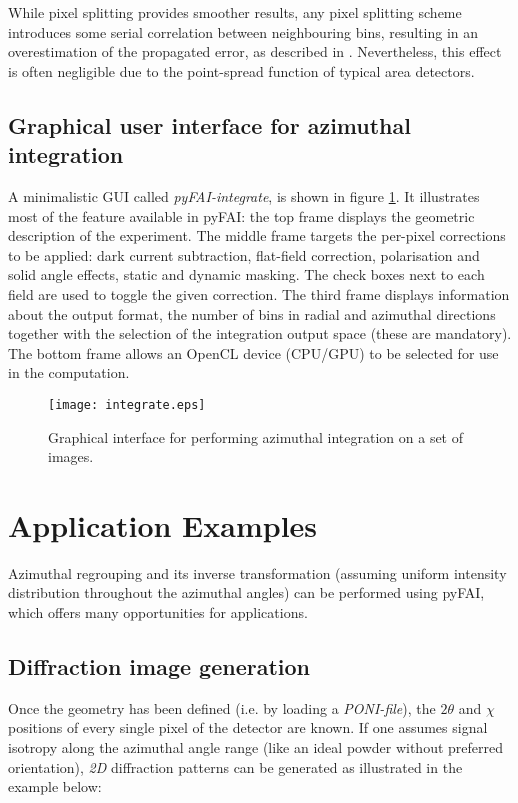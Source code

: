 \documentclass{iucr}
\begin{document}
While pixel splitting provides smoother
results, any pixel splitting scheme introduces some serial correlation between
neighbouring bins, resulting in an overestimation of the propagated error,
as described in \cite{billinge2014}. 
Nevertheless, this effect is often negligible due to the point-spread function
of typical area detectors.

\subsection{Graphical user interface for azimuthal integration}

A minimalistic GUI called \textit{pyFAI-integrate}, is
shown in figure \ref{pyFAI-integrate}.
It illustrates most of the feature available in pyFAI:
the top frame displays the geometric description of the experiment.
The middle frame targets the per-pixel corrections to be applied: dark current
subtraction, flat-field correction, polarisation and solid angle effects, static
and dynamic masking. The check boxes next to each field are used to toggle the given correction.
The third frame displays information about the output format, the
number of bins in radial and azimuthal directions together with the
selection of the integration output space (these are mandatory).
The bottom frame allows an OpenCL device (CPU/GPU) to be selected for use in
the computation.

\begin{figure}
\label{pyFAI-integrate}
\begin{center}
\texttt{[image: integrate.eps]}
\caption{Graphical interface for performing azimuthal integration on a set of
images.}
\end{center}
\end{figure}

\section{Application Examples}

Azimuthal regrouping and its inverse transformation (assuming
uniform intensity distribution throughout the azimuthal angles) can be performed
using pyFAI, which offers many opportunities for applications.

\subsection{Diffraction image generation}

Once the geometry has been defined (i.e. by loading a \textit{PONI-file}), the
$2\theta$ and $\chi$ positions of every single pixel of the detector are known.
If one assumes signal isotropy along the azimuthal angle range (like an
ideal powder without preferred orientation), \textit{2D} diffraction patterns can be
generated as illustrated in the example below:
\end{document}
